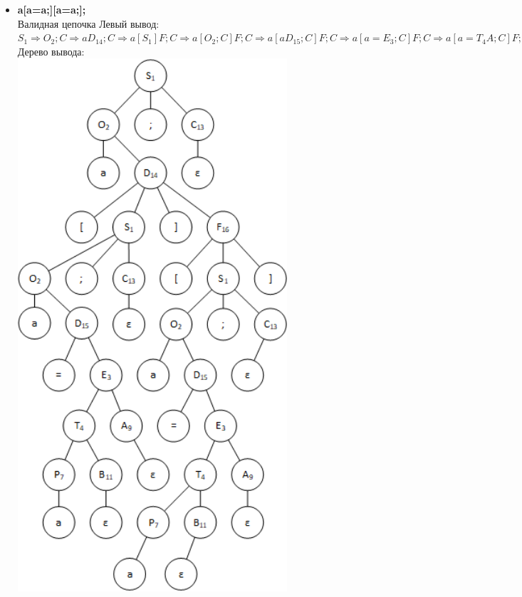 \documentclass[a4paper,14pt]{extarticle}
\begin{document}
\begin{enumerate}[1.]
\begin{itemize}
    \item \textbf{a[a=a;][a=a;];}\\
        Валидная цепочка\bigbreak
        Левый вывод:\\
        $S_{1} \Rightarrow O_{2};C \Rightarrow aD_{14};C \Rightarrow a[S_{1}]F;C \Rightarrow a[O_{2};C]F;C \Rightarrow 
        a[aD_{15};C]F;C \Rightarrow a[a=E_{3};C]F;C \Rightarrow a[a=T_{4}A;C]F;C \Rightarrow 
        a[a=P_{7}BA;C]F;C \Rightarrow a[a=aB_{11}A;C]F;C \Rightarrow a[a=aA_{9};C]F;C \Rightarrow a[a=a;C_{13}]F;C \Rightarrow 
        a[a=a;]F_{16};C \Rightarrow a[a=a;][S_{1}];C \Rightarrow a[a=a;][O_{2};C];C \Rightarrow a[a=a;][aD;C];C \Rightarrow
        a[a=a;][aD_{15};C];C \Rightarrow a[a=a;][a=E_{3};C];C \Rightarrow a[a=a;][a=T_{4}A;C];C \Rightarrow 
        a[a=a;][a=P_{7}BA;C];C \Rightarrow a[a=a;][a=aB_{11}A;C];C \Rightarrow a[a=a;][a=aA_{9};C];C \Rightarrow
        a[a=a;][a=a;C_{13}];C \Rightarrow a[a=a;][a=a;];C_{13} \Rightarrow a[a=a;][a=a;];$
    \bigbreak
    Дерево вывода:\\
    \includegraphics[width=100mm]{task_6_2}
    

\end{itemize}
\end{enumerate}
\end{document}
